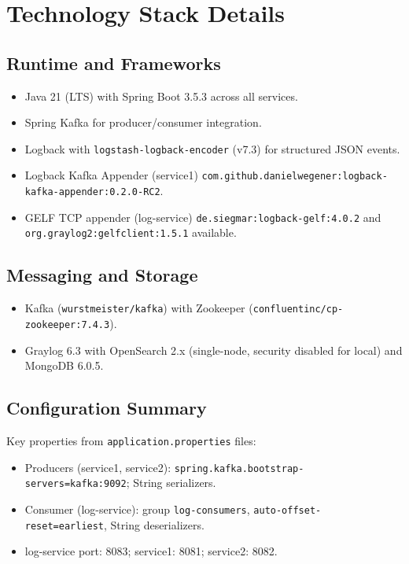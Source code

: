 \documentclass[12pt,a4paper]{report}
\begin{document}
\section{Technology Stack Details}
\subsection{Runtime and Frameworks}
\begin{itemize}[leftmargin=1.2cm]
  \item Java 21 (LTS) with Spring Boot 3.5.3 across all services.
  \item Spring Kafka for producer/consumer integration.
  \item Logback with \texttt{logstash-logback-encoder} (v7.3) for structured JSON events.
  \item Logback Kafka Appender (service1) \texttt{com.github.danielwegener:logback-kafka-appender:0.2.0-RC2}.
  \item GELF TCP appender (log-service) \texttt{de.siegmar:logback-gelf:4.0.2} and \texttt{org.graylog2:gelfclient:1.5.1} available.
\end{itemize}

\subsection{Messaging and Storage}
\begin{itemize}[leftmargin=1.2cm]
  \item Kafka (\texttt{wurstmeister/kafka}) with Zookeeper (\texttt{confluentinc/cp-zookeeper:7.4.3}).
  \item Graylog 6.3 with OpenSearch 2.x (single-node, security disabled for local) and MongoDB 6.0.5.
\end{itemize}

\subsection{Configuration Summary}
Key properties from \texttt{application.properties} files:
\begin{itemize}[leftmargin=1.2cm]
  \item Producers (service1, service2): \texttt{spring.kafka.bootstrap-servers=kafka:9092}; String serializers.
  \item Consumer (log-service): group \texttt{log-consumers}, \texttt{auto-offset-reset=earliest}, String deserializers.
  \item log-service port: 8083; service1: 8081; service2: 8082.
\end{itemize}
\end{document}
